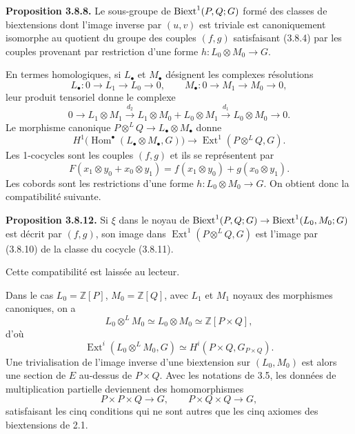 \documentclass[11pt]{article}
\providecommand{\Z}{\mathbb Z}
\providecommand{\Hom}{\operatorname{Hom}}
\providecommand{\Ext}{\operatorname{Ext}}
\begin{document}
\textbf{Proposition 3.8.8.}  Le sous-groupe de \(\operatorname{Biext}^1(P,Q;G)\) formé des classes de biextensions dont l'image inverse par \((u,v)\) est triviale est canoniquement isomorphe au quotient du groupe des couples \((f,g)\) satisfaisant (3.8.4) par les couples provenant par restriction d'une forme \(h:L_0\otimes M_0\to G\).

En termes homologiques, si \(L_\bullet\) et \(M_\bullet\) désignent les complexes résolutions
\begin{equation}\tag{3.8.9}
        L_\bullet:0\to L_1\to L_0\to0,
        \qquad
        M_\bullet:0\to M_1\to M_0\to0,
\end{equation}
leur produit tensoriel donne le complexe
\[
        0\to L_1\otimes M_1\xrightarrow{d_2}
        L_1\otimes M_0+L_0\otimes M_1\xrightarrow{d_1}
        L_0\otimes M_0\to0.
\]
Le morphisme canonique \(P\otimes^L Q\to L_\bullet\otimes M_\bullet\) donne
\begin{equation}\tag{3.8.10}
        H^1\bigl(\Hom^\bullet(L_\bullet\otimes M_\bullet,G)\bigr)\to \Ext^1(P\otimes^L Q,G).
\end{equation}
Les 1-cocycles sont les couples \((f,g)\) et ils se représentent par
\begin{equation}\tag{3.8.11}
        F(x_1\otimes y_0+x_0\otimes y_1)=f(x_1\otimes y_0)+g(x_0\otimes y_1).
\end{equation}
Les cobords sont les restrictions d'une forme \(h:L_0\otimes M_0\to G\).  On obtient donc la compatibilité suivante.

\textbf{Proposition 3.8.12.}  Si \(\xi\) dans le noyau de \(\operatorname{Biext}^1(P,Q;G)\to\operatorname{Biext}^1(L_0,M_0;G)\) est décrit par \((f,g)\), son image dans \(\Ext^1(P\otimes^L Q,G)\) est l'image par (3.8.10) de la classe du cocycle (3.8.11).

Cette compatibilité est laissée au lecteur.

Dans le cas \(L_0=\Z[P]\), \(M_0=\Z[Q]\), avec \(L_1\) et \(M_1\) noyaux des morphismes canoniques, on a
\[
        L_0\otimes^L M_0\simeq L_0\otimes M_0\simeq \Z[P\times Q],
\]
d'où
\[
        \Ext^i(L_0\otimes^L M_0,G)\simeq H^i(P\times Q,G_{P\times Q}).
\]
Une trivialisation de l'image inverse d'une biextension sur \((L_0,M_0)\) est alors une section de \(E\) au-dessus de \(P\times Q\).  Avec les notations de 3.5, les données de multiplication partielle deviennent des homomorphismes
\[
        P\times P\times Q\to G,
        \qquad P\times Q\times Q\to G,
\]
satisfaisant les cinq conditions qui ne sont autres que les cinq axiomes des biextensions de 2.1.
\end{document}
